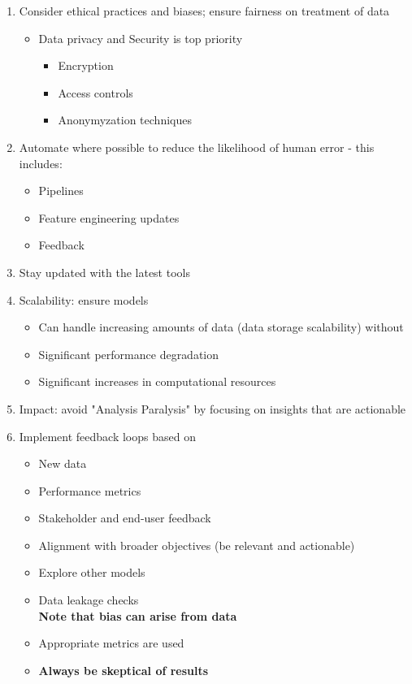 \documentclass[11pt]{report}
\begin{document}
{\begin{enumerate}
		\item Consider ethical practices and biases; ensure fairness on treatment of data 
		\begin{itemize}
			\item Data privacy and Security is top priority
				\begin{itemize}
					\item Encryption
					\item Access controls 
					\item Anonymyzation techniques
				\end{itemize}
		\end{itemize}
		\item Automate where possible to reduce the likelihood of human error - this includes:
		\begin{itemize}
			\item Pipelines
			\item Feature engineering updates 
			\item Feedback 
		\end{itemize}
		\item Stay updated with the latest tools
		\item Scalability: ensure models  
		\begin{itemize}
			\item Can handle increasing amounts of data (data storage scalability) without 
			\item Significant performance degradation 
			\item Significant increases in computational resources
		\end{itemize} 
		\item Impact: avoid "Analysis Paralysis" by focusing on insights that are actionable 
		\item Implement feedback loops based on
		\begin{itemize}
			\item New data
			\item Performance metrics
			\item Stakeholder and end-user feedback
			\item Alignment with broader objectives (be relevant and actionable)
			\item Explore other models
			\item Data leakage checks \\
			\textbf{Note that bias can arise from data}
			\item Appropriate metrics are used 
			\item \textbf{Always be skeptical of results}

\end{itemize}
\end{enumerate}}
\end{document}
